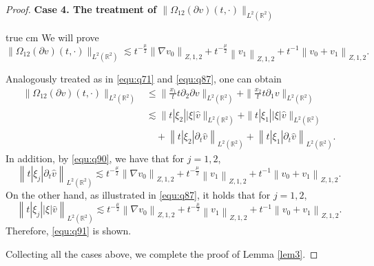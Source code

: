 \documentclass[10pt,a4paper]{amsart}
\newcommand{\R}{\mathbb R}
\newcommand{\f}{\frac}
\newcommand{\p}{\partial}
\begin{document}
\begin{proof}
{\bf Case 4.  The treatment  of $\|\Omega_{12}(\p v)(t, \cdot)\|_{L^2(\R^2)}$}

 true cm
We will prove
\begin{equation}\label{equ:q91}
\|\Omega_{12}(\p v)(t, \cdot)\|_{L^2(\R^2)} \lesssim t^{-\f{\mu}{2}}\left\|\nabla v_0\right\|_{Z, 1, 2}
+t^{-\f{\mu}{2}}\left\| v_1\right\|_{Z, 1, 2}+t^{-1}\left\|v_0+v_1\right\|_{Z, 1, 2}.
\end{equation}

Analogously treated as in \eqref{equ:q71} and \eqref{equ:q87}, one can obtain
\begin{equation}\label{equ:q92}
\begin{aligned}
\|\Omega_{12}(\p v)(t, \cdot)\|_{L^2(\R^2)}
& \leq \|\f{x_1}{t}t\p_2\p v\|_{L^2(\R^2)}+\|\f{x_2}{t}t\p_1v\|_{L^2(\R^2)}\\
& \lesssim \|t|\xi_2||\xi|\hat{v}\|_{L^2(\R^2)}+\|t|\xi_1||\xi|\hat{v}\|_{L^2(\R^2)}\\
&\quad+\left\|t|\xi_2|\p_t\hat{v}\right\|_{L^2(\R^2)}+\left\|t|\xi_1|\p_t\hat{v}\right\|_{L^2(\R^2)}.
\end{aligned}
\end{equation}
In addition, by \eqref{equ:q90}, we have that for $j=1,2$,
$$
\left\|t|\xi_j|\p_t\hat{v}\right\|_{L^2(\R^2)} \lesssim t^{-\f{\mu}{2}}\left\|\nabla v_0\right\|_{Z, 1, 2}
+t^{-\f{\mu}{2}}\left\| v_1\right\|_{Z, 1, 2}+t^{-1}\left\|v_0+v_1\right\|_{Z, 1, 2}.
$$
On the other hand, as illustrated in \eqref{equ:q87}, it holds that for $j=1, 2$,
$$
\left\|t|\xi_j||\xi|\hat{v}\right\|_{L^2(\R^2)} \lesssim t^{-\f{\mu}{2}}\left\|\nabla v_0\right\|_{Z, 1, 2}
+t^{-\f{\mu}{2}}\left\| v_1\right\|_{Z, 1, 2}+t^{-1}\left\|v_0+v_1\right\|_{Z, 1, 2}.
$$
Therefore, \eqref{equ:q91} is shown.

Collecting all the cases above, we complete the proof of Lemma \ref{lem3}.





\end{proof}
\end{document}
